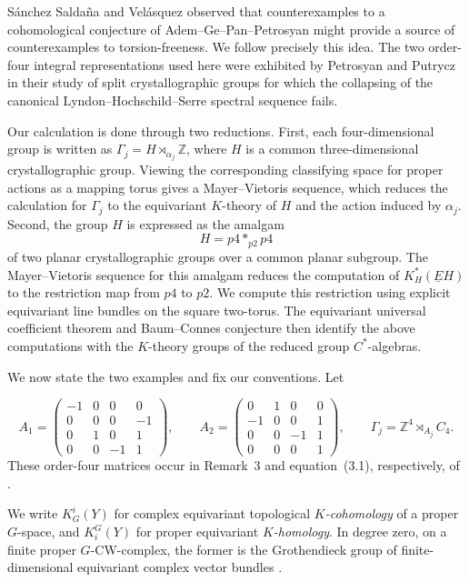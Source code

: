\documentclass[11pt]{amsart}
\newcommand{\Z}{\mathbb Z}
\theoremstyle{remark}
\numberwithin{equation}{section}
\begin{document}
S\'anchez Salda\~na and Vel\'asquez observed that counterexamples to a cohomological conjecture of Adem--Ge--Pan--Petrosyan might provide a source of counterexamples to torsion-freeness. We follow precisely this idea. The two order-four integral representations used here were exhibited by Petrosyan and Putrycz \cite{PP} in their study of split crystallographic groups for which the collapsing of the canonical Lyndon--Hochschild--Serre spectral sequence fails.

Our calculation is done through two reductions. First, each four-dimensional group is written as $\Gamma_j=H\rtimes_{\alpha_j}\Z$, where $H$ is a common three-dimensional crystallographic group. Viewing the corresponding classifying space for proper actions as a mapping torus gives a Mayer--Vietoris sequence, which reduces the calculation for $\Gamma_j$ to the equivariant $K$-theory of $H$ and the action induced by $\alpha_j$. Second, the group $H$ is expressed as the amalgam
\[
 H=p4*_{p2}p4
\]
of two planar crystallographic groups over a common planar subgroup. The Mayer--Vietoris sequence for this amalgam reduces the computation of $K_H^*(\underline EH)$ to the restriction map from $p4$ to $p2$. We compute this restriction using explicit equivariant line bundles on the square two-torus. The equivariant universal coefficient theorem and Baum--Connes conjecture then identify the above computations with the $K$-theory groups of the reduced group $C^*$-algebras.

We now state the two examples and fix our conventions. Let

\[
 A_1=\begin{pmatrix}-1&0&0&0\\0&0&0&-1\\0&1&0&1\\0&0&-1&1\end{pmatrix},
 \qquad
 A_2=\begin{pmatrix}0&1&0&0\\-1&0&0&1\\0&0&-1&1\\0&0&0&1\end{pmatrix},
 \qquad \Gamma_j=\Z^4\rtimes_{A_j}C_4.
\]
These order-four matrices occur in Remark~3 and equation~(3.1), respectively, of \cite{PP}.

We write $K_G^i(Y)$ for complex equivariant topological \emph{$K$-cohomology} of a proper $G$-space, and $K_i^G(Y)$ for proper equivariant \emph{$K$-homology}. In degree zero, on a finite proper $G$-CW-complex, the former is the Grothendieck group of finite-dimensional equivariant complex vector bundles \cite{LO}.
\end{document}
